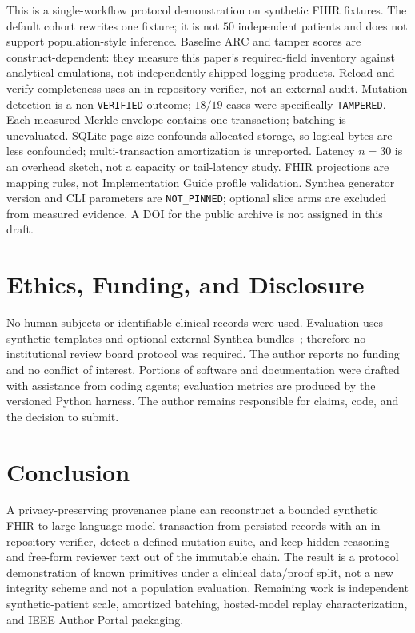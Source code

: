 \documentclass[journal]{IEEEtran}
\begin{document}
This is a single-workflow protocol demonstration on synthetic FHIR fixtures.
The default cohort rewrites one fixture; it is not $50$ independent patients
and does not support population-style inference. Baseline ARC and tamper
scores are construct-dependent: they measure this paper's required-field
inventory against analytical emulations, not independently shipped logging
products. Reload-and-verify completeness uses an in-repository verifier, not
an external audit. Mutation detection is a non-\texttt{VERIFIED} outcome;
$18/19$ cases were specifically \texttt{TAMPERED}. Each measured Merkle
envelope contains one transaction; batching is unevaluated. SQLite page size
confounds allocated storage, so logical bytes are less confounded;
multi-transaction amortization is unreported. Latency $n=30$ is an overhead
sketch, not a capacity or tail-latency study. FHIR
projections are mapping rules, not Implementation Guide profile validation.
Synthea generator version and CLI parameters are \texttt{NOT\_PINNED}; optional
slice arms are excluded from measured evidence. A DOI for the public archive
is not assigned in this draft.

\section{Ethics, Funding, and Disclosure}
\label{sec:ethics}

No human subjects or identifiable clinical records were used. Evaluation uses
synthetic templates and optional external Synthea bundles~\cite{walonoski2018synthea};
therefore no institutional review board protocol was required. The author reports no funding and no conflict
of interest. Portions of software and documentation were drafted with
assistance from coding agents; evaluation metrics are produced by the
versioned Python harness. The author remains responsible for claims, code, and
the decision to submit.

\section{Conclusion}
\label{sec:conclusion}

A privacy-preserving provenance plane can reconstruct a bounded synthetic
FHIR-to-large-language-model transaction from persisted records with an
in-repository verifier, detect a defined mutation suite, and
keep hidden reasoning and free-form reviewer text out of the immutable chain.
The result is a protocol demonstration of known primitives under a clinical
data/proof split, not a new integrity scheme and not a population evaluation.
Remaining work is independent synthetic-patient scale, amortized batching,
hosted-model replay characterization, and IEEE Author Portal packaging.



\end{document}
